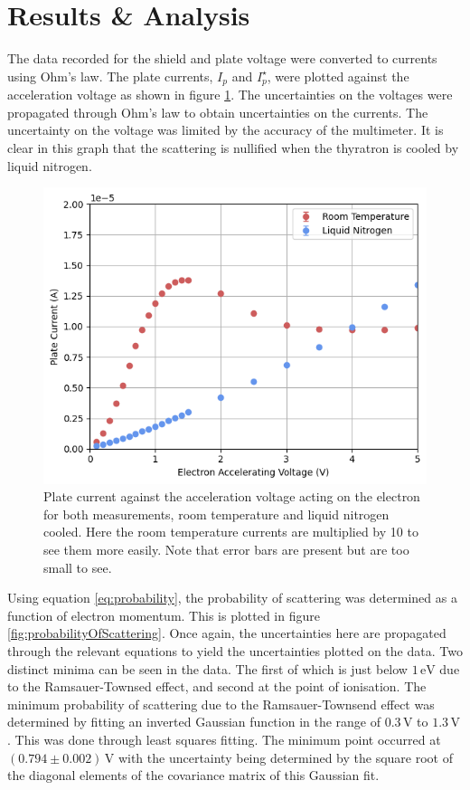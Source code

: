 \documentclass[%
reprint,
amsmath,amssymb,
aps,
floatfix
]{revtex4-2}
\begin{document}
	\section{Results \& Analysis}
	The data recorded for the shield and plate voltage were converted to currents using Ohm's law. The plate currents, $I_p$ and $I_p^\star$, were plotted against the acceleration voltage as shown in figure \ref{fig:plateCurrentGraph}. The uncertainties on the voltages were propagated through Ohm's law to obtain uncertainties on the currents. The uncertainty on the voltage was limited by the accuracy of the multimeter. It is clear in this graph that the scattering is nullified when the thyratron is cooled by liquid nitrogen.\\
	
	\begin{figure}
		\includegraphics[width=\columnwidth]{plateCurrentGraph.png}
		\caption{\label{fig:plateCurrentGraph}Plate current against the acceleration voltage acting on the electron for both measurements, room temperature and liquid nitrogen cooled. Here the room temperature currents are multiplied by 10 to see them more easily. Note that error bars are present but are too small to see.}
	\end{figure}
	
	Using equation \ref{eq:probability}, the probability of scattering was determined as a function of electron momentum. This is plotted in figure \ref{fig:probabilityOfScattering}. Once again, the uncertainties here are propagated through the relevant equations to yield the uncertainties plotted on the data. Two distinct minima can be seen in the data. The first of which is just below $1 \,\text{eV}$ due to the Ramsauer-Townsed effect, and second at the point of ionisation. The minimum probability of scattering due to the Ramsauer-Townsend effect was determined by fitting an inverted Gaussian function in the range of $0.3 \,\text{V}$ to $1.3 \,\text{V}$. This was done through least squares fitting. The minimum point occurred at $(0.794 \pm 0.002) \,\text{V}$ with the uncertainty being determined by the square root of the diagonal elements of the covariance matrix of this Gaussian fit.\\ 
	
\end{document}
